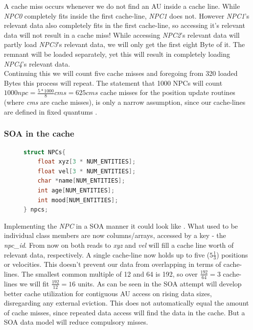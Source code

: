 A cache miss occurs whenever we do not find an AU inside a cache line. While \textit{NPC0} completely fits inside the first cache-line, \textit{NPC1} does not. However \textit{NPC1}'s relevant data also completely fits in the first cache-line, so accessing it's relevant data will not result in a cache miss! While accessing \textit{NPC2}'s relevant data will partly load \textit{NPC3}'s relevant data, we will only get the first eight Byte of it. The remnant will be loaded separately, yet this will result in completely loading \textit{NPC4}'s relevant data.\\
Continuing this we will count five cache misses and foregoing from 320 loaded Bytes this process will repeat. The statement that 1000 NPCs will count $1000 npc = \frac{5 * 1000}{8} cms = 625 cms
$ cache misses for the position update routines (where \textit{cms} are cache misses), is only a narrow assumption, since our cache-lines are defined in fixed quantums .
\subsubsection{SOA in the cache}
\begin{figure}
\begin{lstlisting}[language=C++,numbers=none,name={SOA variant of the NPC},label={soa_npc}]
struct NPCs{
	float xyz[3 * NUM_ENTITIES];
	float vel[3 * NUM_ENTITIES];
	char *name[NUM_ENTITIES];
	int age[NUM_ENTITIES];
	int mood[NUM_ENTITIES];
} npcs;
\end{lstlisting}
\end{figure}
Implementing the \textit{NPC} in a SOA manner it could look like . What used to be individual class members are now columns/arrays, accessed by a key - the \textit{npc\_id}. From now on both reads to \textit{xyz} and \textit{vel} will fill a cache line worth of relevant data, respectively. A single cache-line now holds up to five ($5\frac{1}{3}$) positions or velocities. This doesn't prevent our data from overlapping in terms of cache-lines. The smallest common multiple of 12 and 64 is 192, so over $\frac{192}{64}=3$ cache-lines we will fit $\frac{192}{12}=16$ units. As can be seen in  the SOA attempt will develop better cache utilization for contiguous AU access on rising data sizes, disregarding any external eviction. This does not automatically equal the amount of cache misses, since repeated data access will find the data in the cache. But a SOA data model will reduce compulsory misses.
